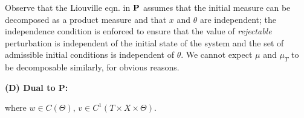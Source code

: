 \documentclass{article}
\providecommand{\ip}[1]{\ensuremath \langle #1 \rangle}
\begin{document}
Observe that the Liouville eqn. in ${\bf P}$ assumes that the initial measure can be decomposed as a product measure and that $x$ and $\theta$ are independent; the independence condition is enforced to ensure that the value of \emph{rejectable} perturbation is independent of the initial state of the system and the set of admissible initial conditions is independent of $\theta$. We cannot expect $\mu$ and $\mu_T$ to be decomposable similarly, for obvious reasons.
\par
{\bf (D) Dual to P:}
where $w\in C(\Theta),\,v\in C^1(T\times X\times \Theta)$.
\end{document}
